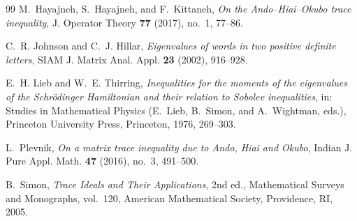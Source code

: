 \documentclass{amsart}
\theoremstyle{definition}
\theoremstyle{remark}
\numberwithin{equation}{section}
\begin{document}
\begin{thebibliography}{99}
M.~Hayajneh, S.~Hayajneh, and F.~Kittaneh, \emph{On the Ando--Hiai--Okubo trace inequality}, J. Operator Theory \textbf{77} (2017), no.~1, 77--86.

C.~R. Johnson and C.~J. Hillar, \emph{Eigenvalues of words in two positive definite letters}, SIAM J. Matrix Anal. Appl. \textbf{23} (2002), 916--928.

E.~H. Lieb and W.~E. Thirring, \emph{Inequalities for the moments of the eigenvalues of the Schr\"odinger Hamiltonian and their relation to Sobolev inequalities}, in: Studies in Mathematical Physics (E.~Lieb, B.~Simon, and A.~Wightman, eds.), Princeton University Press, Princeton, 1976, 269--303.

L.~Plevnik, \emph{On a matrix trace inequality due to Ando, Hiai and Okubo}, Indian J. Pure Appl. Math. \textbf{47} (2016), no.~3, 491--500.

B.~Simon, \emph{Trace Ideals and Their Applications}, 2nd ed., Mathematical Surveys and Monographs, vol.~120, American Mathematical Society, Providence, RI, 2005.

\end{thebibliography}
\end{document}
